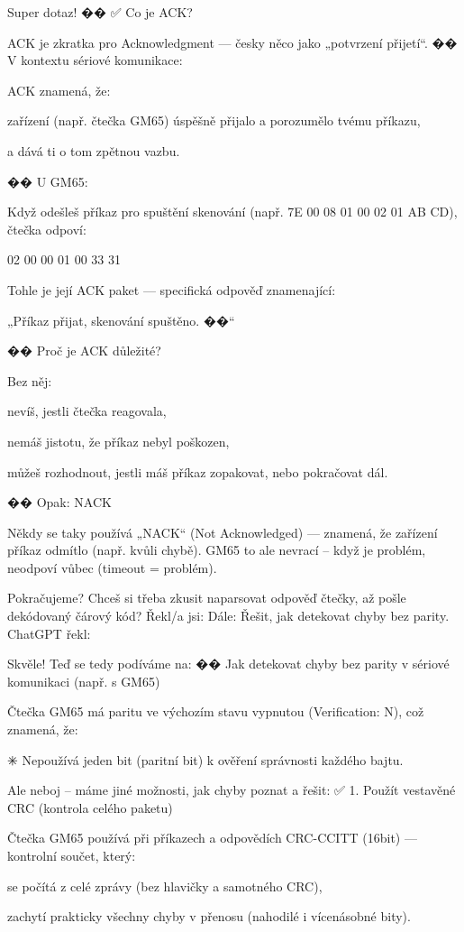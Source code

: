 Super dotaz! ��
✅ Co je ACK?

ACK je zkratka pro Acknowledgment — česky něco jako „potvrzení přijetí“.
�� V kontextu sériové komunikace:

ACK znamená, že:

    zařízení (např. čtečka GM65) úspěšně přijalo a porozumělo tvému příkazu,

    a dává ti o tom zpětnou vazbu.

�� U GM65:

Když odešleš příkaz pro spuštění skenování (např. 7E 00 08 01 00 02 01 AB CD), čtečka odpoví:

02 00 00 01 00 33 31

Tohle je její ACK paket — specifická odpověď znamenající:

    „Příkaz přijat, skenování spuštěno. ��“

�� Proč je ACK důležité?

Bez něj:

    nevíš, jestli čtečka reagovala,

    nemáš jistotu, že příkaz nebyl poškozen,

    můžeš rozhodnout, jestli máš příkaz zopakovat, nebo pokračovat dál.

�� Opak: NACK

Někdy se taky používá „NACK“ (Not Acknowledged) — znamená, že zařízení příkaz odmítlo (např. kvůli chybě). GM65 to ale nevrací – když je problém, neodpoví vůbec (timeout = problém).

Pokračujeme? Chceš si třeba zkusit naparsovat odpověď čtečky, až pošle dekódovaný čárový kód?
Řekl/a jsi:
Dále: Řešit, jak detekovat chyby bez parity.
ChatGPT řekl:

Skvěle! Teď se tedy podíváme na:
�� Jak detekovat chyby bez parity v sériové komunikaci (např. s GM65)

Čtečka GM65 má paritu ve výchozím stavu vypnutou (Verification: N), což znamená, že:

    ✳️ Nepoužívá jeden bit (paritní bit) k ověření správnosti každého bajtu.

Ale neboj – máme jiné možnosti, jak chyby poznat a řešit:
✅ 1. Použít vestavěné CRC (kontrola celého paketu)

Čtečka GM65 používá při příkazech a odpovědích CRC-CCITT (16bit) — kontrolní součet, který:

    se počítá z celé zprávy (bez hlavičky a samotného CRC),

    zachytí prakticky všechny chyby v přenosu (nahodilé i vícenásobné bity).


